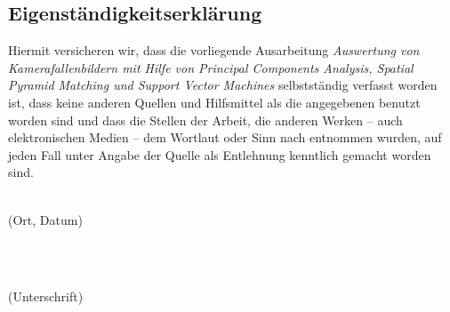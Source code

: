 \subsection*{Eigenständigkeitserklärung}
Hiermit versicheren wir, dass die vorliegende Ausarbeitung \textit{Auswertung von Kamerafallenbildern mit Hilfe von Principal Components Analysis, Spatial Pyramid Matching und Support Vector Machines} selbstständig verfasst worden ist, dass keine anderen Quellen und Hilfsmittel als die angegebenen benutzt worden sind und dass die Stellen der Arbeit, die anderen Werken -- auch elektronischen Medien -- dem Wortlaut oder Sinn nach entnommen wurden, auf jeden Fall unter Angabe der Quelle als Entlehnung kenntlich gemacht worden sind.

\vspace*{2cm}

\begin{minipage}{0.5\textwidth}
	\begin{flushleft} \large
		\underline{\hspace{6cm}} \\
		{\footnotesize (Ort, Datum)}
	\end{flushleft}
\end{minipage}
~
\begin{minipage}{0.5\textwidth}
	\begin{flushright} \large
		\underline{\hspace{6cm}} \\
		{\footnotesize (Unterschrift)}
	\end{flushright}
\end{minipage}\\[0.5cm]